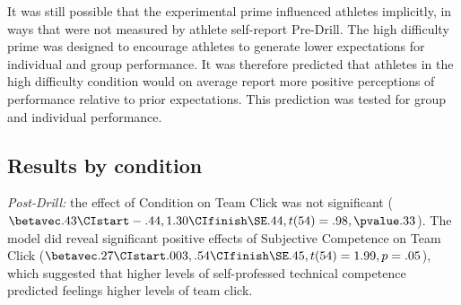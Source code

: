It was still possible that the experimental prime influenced athletes implicitly, in ways that were not measured by athlete self-report Pre-Drill.  The high difficulty prime was designed to encourage athletes to generate lower expectations for individual and group performance. It was therefore predicted that athletes in the high difficulty condition would on average report more positive perceptions of performance relative to prior expectations.  This prediction was tested for group and individual performance.













\subsection{Results by condition}

\textit{Post-Drill:} the effect of Condition on Team Click was not significant ($\betavec .43 \CIstart -.44, 1.30 \CIfinish \SE .44, t(54)= .98, \pvalue .33$). The model did reveal significant positive effects of Subjective Competence on Team Click ($\betavec .27  \CIstart .003, .54 \CIfinish \SE .45, t(54)= 1.99, p = .05$), which suggested that higher levels of self-professed technical competence predicted feelings higher levels of team click.

